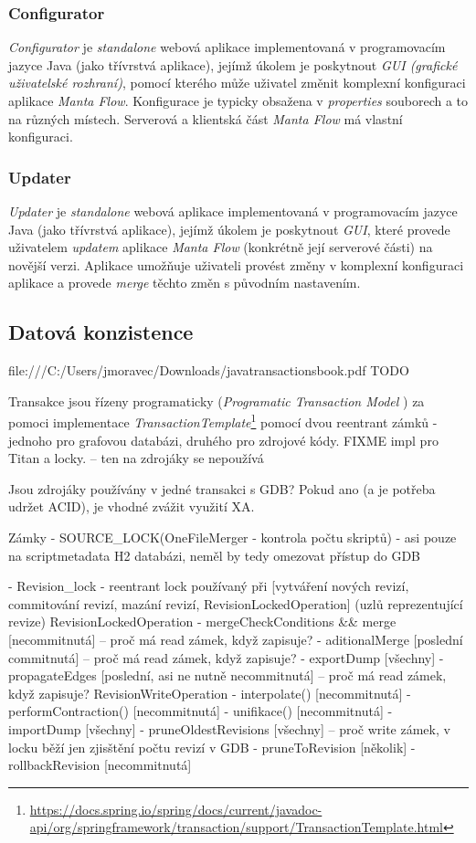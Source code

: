 \subsubsection{Configurator}
\textit{Configurator} je \textit{standalone} webová aplikace implementovaná v programovacím jazyce Java (jako třívrstvá aplikace), jejímž úkolem je poskytnout \textit{GUI (grafické uživatelské rozhraní)}, pomocí kterého může uživatel změnit komplexní konfiguraci aplikace \textit{Manta Flow}. Konfigurace je typicky obsažena v \textit{properties} souborech a to na různých místech. Serverová a klientská část \textit{Manta Flow} má vlastní konfiguraci. \cite{Molitor18}

\subsubsection{Updater}
\textit{Updater} je \textit{standalone} webová aplikace implementovaná v programovacím jazyce Java (jako třívrstvá aplikace), jejímž úkolem je poskytnout \textit{GUI}, které provede uživatelem \textit{updatem} aplikace \textit{Manta Flow} (konkrétně její serverové části) na novější verzi. Aplikace umožňuje uživateli provést změny v komplexní konfiguraci aplikace a provede \textit{merge} těchto změn s původním nastavením. \cite{Gondek16}

\subsection{Datová konzistence}
file:///C:/Users/jmoravec/Downloads/javatransactionsbook.pdf
TODO

Transakce jsou řízeny programaticky (\textit{Programatic Transaction Model} \cite{Little04}) za pomoci implementace \textit{TransactionTemplate}\footnote{\url{https://docs.spring.io/spring/docs/current/javadoc-api/org/springframework/transaction/support/TransactionTemplate.html}} pomocí dvou reentrant zámků - jednoho pro grafovou databázi, druhého pro zdrojové kódy. FIXME impl pro Titan a locky.
-- ten na zdrojáky se nepoužívá

Jsou zdrojáky používány v jedné transakci s GDB? Pokud ano (a je potřeba udržet ACID), je vhodné zvážit využití XA.

Zámky
 - SOURCE_LOCK(OneFileMerger - kontrola počtu skriptů) - asi pouze na scriptmetadata H2 databázi, neměl by tedy omezovat přístup do GDB

 - Revision_lock - reentrant lock používaný při [vytváření nových revizí, commitování revizí, mazání revizí, RevisionLockedOperation] (uzlů reprezentující revize)
 RevisionLockedOperation
  - mergeCheckConditions && merge [necommitnutá] -- proč má read zámek, když zapisuje?
	- aditionalMerge [poslední commitnutá] -- proč má read zámek, když zapisuje?
	- exportDump [všechny]
	- propagateEdges [poslední, asi ne nutně necommitnutá] -- proč má read zámek, když zapisuje?
RevisionWriteOperation
	- interpolate() [necommitnutá]
	- performContraction() [necommitnutá]
	- unifikace() [necommitnutá]
	- importDump [všechny]
	- pruneOldestRevisions [všechny] -- proč write zámek, v locku běží jen zjisštění počtu revizí v GDB
	- pruneToRevision [několik]
	- rollbackRevision [necommitnutá]


